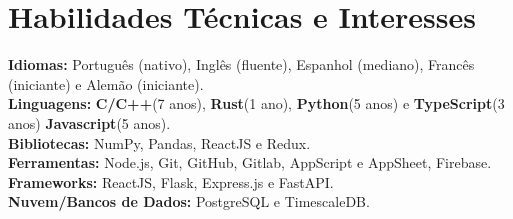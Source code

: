     \vspace{-5.5mm}
  \resumeSubHeadingListEnd
  

\section{\textbf{Habilidades Técnicas e Interesses}}
\begin{itemize}[leftmargin=0.05in, label={}]
    \small{\item{
     \textbf{Idiomas:}{ Português (nativo), Inglês (fluente), Espanhol (mediano), Francês (iniciante) e Alemão (iniciante).} \\
     \textbf{Linguagens:}{ \textbf{C/C++}(7 anos), \textbf{Rust}(1 ano), \textbf{Python}(5 anos) e \textbf{TypeScript}(3 anos) \textbf{Javascript}(5 anos). } \\
     \textbf{Bibliotecas:}{ NumPy, Pandas, ReactJS e Redux. }\\ 
     \textbf{Ferramentas:}{ Node.js, Git, GitHub,  Gitlab, AppScript e AppSheet, Firebase.} \\ 
     \textbf{Frameworks:}{ ReactJS, Flask, Express.js e FastAPI. } \\
     \textbf{Nuvem/Bancos de Dados:}{ PostgreSQL e TimescaleDB. } \\  
    }}
\end{itemize}


